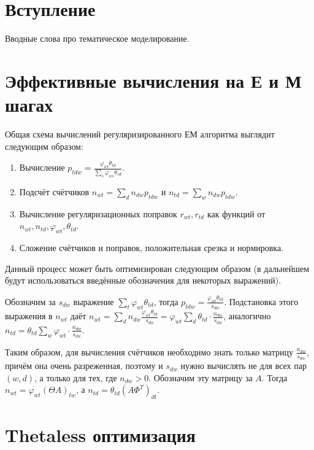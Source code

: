 \documentclass[12pt]{article}
\renewcommand{\phi}{\varphi}
\begin{document}
\section{Вступление}
Вводные слова про тематическое моделирование.
\section{Эффективные вычисления на Е и М шагах}
Общая схема вычислений регуляризированного ЕМ алгоритма выглядит следующим образом:
\begin{enumerate}
\item Вычисление $p_{tdw} = \frac{\phi_{wt} \theta_{td}}{\sum_s \phi_{ws} \theta_{sd}}$.
\item Подсчёт счётчиков $n_{wt} = \sum_d n_{dw} p_{tdw}$ и $n_{td} = \sum_w n_{dw} p_{tdw}$.
\item Вычисление регуляризационных поправок $r_{wt}, r_{td}$ как функций от $n_{wt}, n_{td}, \phi_{wt}, \theta_{td}$.
\item Сложение счётчиков и поправок, положительная срезка и нормировка.
\end{enumerate}

Данный процесс может быть оптимизирован следующим образом (в дальнейшем будут использоваться введённые обозначения для некоторых выражений).

Обозначим за $s_{dw}$ выражение $\sum_t \phi_{wt} \theta_{td}$, тогда $p_{tdw} = \frac{\phi_{wt} \theta_{td}}{s_{dw}}$. Подстановка этого выражения в $n_{wt}$ даёт $n_{wt} = \sum_d n_{dw} \frac{\phi_{wt} \theta_{td}}{s_{dw}} = \phi_{wt} \sum_d \theta_{td} \cdot \frac{n_{dw}}{s_{dw}}$, аналогично $n_{td} = \theta_{td} \sum_w \phi_{wt} \cdot \frac{n_{dw}}{s_{dw}}$.

Таким образом, для вычисления счётчиков необходимо знать только матрицу $\frac{n_{dw}}{s_{dw}}$, причём она очень разреженная, поэтому и $s_{dw}$ нужно вычислять не для всех пар $(w, d)$, а только для тех, где $n_{dw} > 0$. Обозначим эту матрицу за $A$. Тогда $n_{wt} = \phi_{wt} (\Theta A)_{tw}$, а $n_{td} = \theta_{td} (A \Phi^T)_{dt}$.


\section{Thetaless оптимизация}
\end{document}
